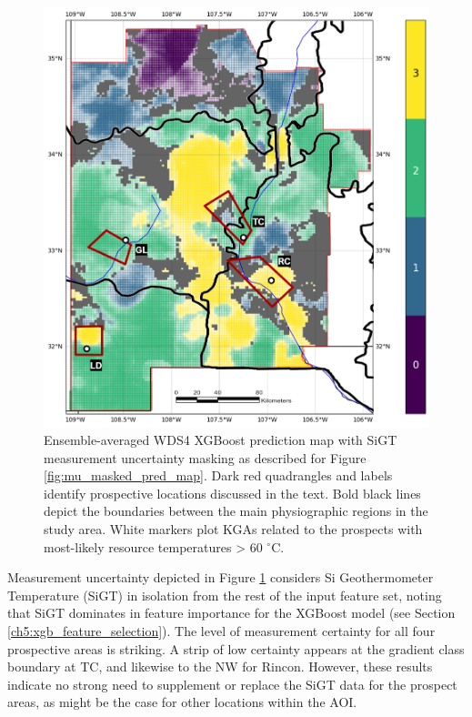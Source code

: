 \begin{figure}
\centering
\includegraphics[width=.75\textwidth]{templates/images/Figure-MU_Masked_Average_Gradient_Map_Prospect_Zones.png}
\caption[Measurement uncertainty map with prospective areas]
{Ensemble-averaged WDS4 XGBoost prediction map with SiGT measurement uncertainty masking as described for Figure \ref{fig:mu_masked_pred_map}. Dark red quadrangles and labels identify prospective locations discussed in the text. Bold black lines depict the boundaries between the main physiographic regions in the study area. White markers plot KGAs related to the prospects with most-likely resource temperatures > 60 $^\circ$C.}
\label{fig:measure_uncertainty_prospects}
\end{figure}

Measurement uncertainty depicted in Figure \ref{fig:measure_uncertainty_prospects} considers Si Geothermometer Temperature (SiGT) in isolation from the rest of the input feature set, noting that SiGT dominates in feature importance for the XGBoost model (see Section \ref{ch5:xgb_feature_selection}). The level of measurement certainty for all four prospective areas is striking. A strip of low certainty appears at the gradient class boundary at TC, and likewise to the NW for Rincon. However, these results indicate no strong need to supplement or replace the SiGT data for the prospect areas, as might be the case for other locations within the AOI.

